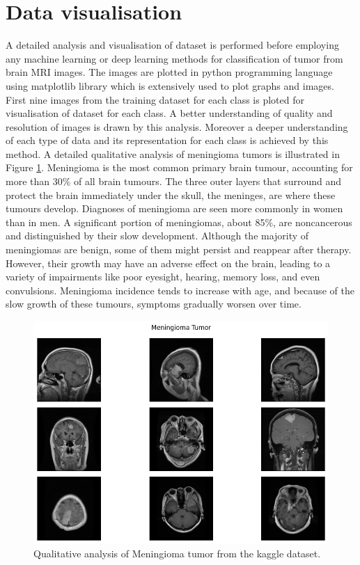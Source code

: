 \documentclass[12pt, a4paper,twoside]{report}
\theoremstyle{plain} %
\theoremstyle{definition} %
\theoremstyle{remark} %
\numberwithin{equation}{chapter}
\begin{document}
\section{Data visualisation}\label{sec:3.2}
A detailed analysis and visualisation of dataset is performed before employing any machine learning or deep learning methods for classification of tumor from brain MRI images. The images are plotted in python programming language using matplotlib library which is extensively used to plot graphs and images. First nine images from the training dataset for each class is ploted for visualisation of dataset for each class. A better understanding of quality and resolution of images is drawn by this analysis. Moreover a deeper understanding of each type of data and its representation for each class is achieved by this method. A detailed qualitative analysis of meningioma tumors is illustrated in Figure \ref{fig:meningioma}. Meningioma is the most common primary brain tumour, accounting for more than 30\% of all brain tumours. The three outer layers that surround and protect the brain immediately under the skull, the meninges, are where these tumours develop. Diagnoses of meningioma are seen more commonly in women than in men. A significant portion of meningiomas, about 85\%, are noncancerous and distinguished by their slow development. Although the majority of meningiomas are benign, some of them might persist and reappear after therapy. However, their growth may have an adverse effect on the brain, leading to a variety of impairments like poor eyesight, hearing, memory loss, and even convulsions. Meningioma incidence tends to increase with age, and because of the slow growth of these tumours, symptoms gradually worsen over time.

\begin{figure}
    \centering
    \includegraphics[scale=0.7]{Meningioma.png}
    \caption{Qualitative analysis of Meningioma tumor from the kaggle dataset.}
    \label{fig:meningioma}
\end{figure}
\end{document}
